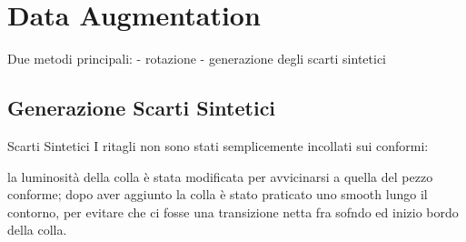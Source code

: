 \section {Data Augmentation}
Due metodi principali:
 - rotazione
 - generazione degli scarti sintetici

\subsection {Generazione Scarti Sintetici}


Scarti Sintetici
 I ritagli non sono stati semplicemente incollati sui conformi:

 la luminosità della colla è stata modificata per avvicinarsi a quella del pezzo conforme;
 dopo aver aggiunto la colla è stato praticato uno smooth lungo il contorno, per evitare che ci fosse una transizione netta fra sofndo ed inizio bordo della colla.







































